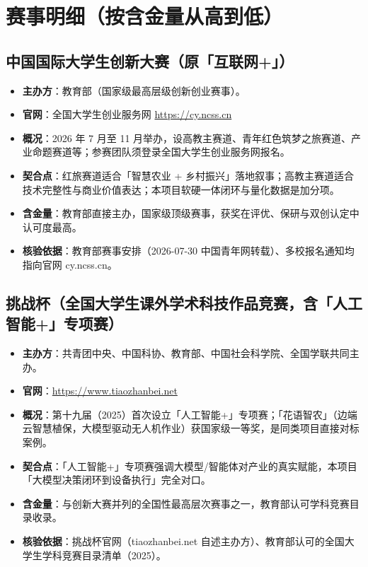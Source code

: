 \documentclass[11pt]{ctexart}
\begin{document}
\section{赛事明细（按含金量从高到低）}

\subsection{中国国际大学生创新大赛（原「互联网+」）}
\begin{itemize}
  \item \textbf{主办方}：教育部（国家级最高层级创新创业赛事）。
  \item \textbf{官网}：全国大学生创业服务网 \url{https://cy.ncss.cn}
  \item \textbf{概况}：2026 年 7 月至 11 月举办，设高教主赛道、青年红色筑梦之旅赛道、产业命题赛道等；参赛团队须登录全国大学生创业服务网报名。
  \item \textbf{契合点}：红旅赛道适合「智慧农业 + 乡村振兴」落地叙事；高教主赛道适合技术完整性与商业价值表达；本项目软硬一体闭环与量化数据是加分项。
  \item \textbf{含金量}：教育部直接主办，国家级顶级赛事，获奖在评优、保研与双创认定中认可度最高。
  \item \textbf{核验依据}：教育部赛事安排（2026-07-30 中国青年网转载）、多校报名通知均指向官网 cy.ncss.cn。
\end{itemize}

\subsection{挑战杯（全国大学生课外学术科技作品竞赛，含「人工智能+」专项赛）}
\begin{itemize}
  \item \textbf{主办方}：共青团中央、中国科协、教育部、中国社会科学院、全国学联共同主办。
  \item \textbf{官网}：\url{https://www.tiaozhanbei.net}
  \item \textbf{概况}：第十九届（2025）首次设立「人工智能+」专项赛；「花语智农」（边端云智慧植保，大模型驱动无人机作业）获国家级一等奖，是同类项目直接对标案例。
  \item \textbf{契合点}：「人工智能+」专项赛强调大模型/智能体对产业的真实赋能，本项目「大模型决策闭环到设备执行」完全对口。
  \item \textbf{含金量}：与创新大赛并列的全国性最高层次赛事之一，教育部认可学科竞赛目录收录。
  \item \textbf{核验依据}：挑战杯官网（tiaozhanbei.net 自述主办方）、教育部认可的全国大学生学科竞赛目录清单（2025）。
\end{itemize}
\end{document}
